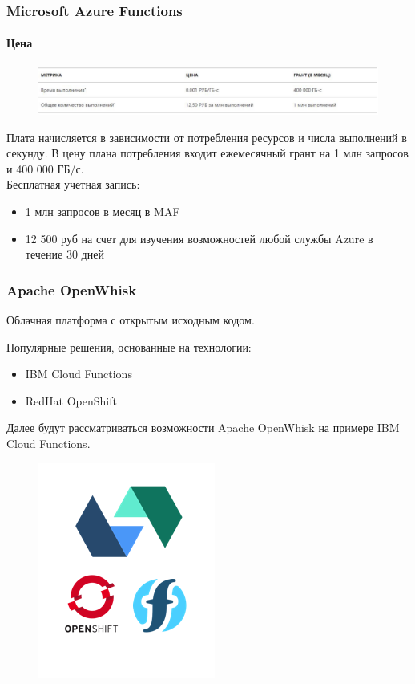 \documentclass{beamer}
\begin{document}
    \begin{frame}
        \frametitle{Microsoft Azure Functions}
        \framesubtitle{Цена}
        \begin{figure}
            \includegraphics[width=1.05\linewidth]{images/azurePrice}
        \end{figure}
        Плата начисляется в зависимости от потребления ресурсов и числа выполнений в секунду. В цену плана потребления входит ежемесячный грант на 1 млн запросов и 400 000 ГБ/с.\\
        \vspace*{0.5cm}
        Бесплатная учетная запись:
        \begin{itemize}
            \item 1 млн запросов в месяц в MAF
            \item 12 500 руб на счет для изучения возможностей любой службы Azure в течение 30 дней
        \end{itemize}
    \end{frame}


    \begin{frame}
        \frametitle{Apache OpenWhisk}
        Облачная платформа с открытым исходным кодом.

        Популярные решения, основанные на технологии:
        \begin{itemize}
            \item IBM Cloud Functions
            \item RedHat OpenShift
        \end{itemize}

        Далее будут рассматриваться возможности Apache OpenWhisk на примере IBM Cloud Functions.

        \begin{figure}
            \includegraphics[width=0.4\linewidth]{images/apache}
        \end{figure}
    \end{frame}
\end{document}
